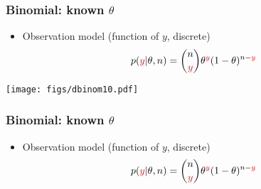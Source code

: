 \documentclass[10pt]{beamer}
\begin{document}
\begin{frame}
  \frametitle{Binomial: known $\theta$}

  \begin{itemize}
  \item {\color{blue}Observation model} (function of {\color{red} $y$}, discrete)
    \begin{align*}
      p({\color{red}y}|\theta,n) = \binom{n}{{\color{red}y}} \theta^{\color{red}y}(1-\theta)^{n-{\color{red}y}}
    \end{align*}
  \end{itemize}

  \begin{center}
    {\texttt{[image: figs/dbinom10.pdf]}\\
      \vspace{-0.6\baselineskip}
}
\end{center}
\end{frame}

\begin{frame}
  \frametitle{Binomial: known $\theta$}

  \begin{itemize}
  \item {\color{blue}Observation model} (function of {\color{red} $y$}, discrete)
    \begin{align*}
      p({\color{red}y}|\theta,n) = \binom{n}{{\color{red}y}} \theta^{\color{red}y}(1-\theta)^{n-{\color{red}y}}
    \end{align*}
  \end{itemize}

  \begin{center}
\end{center}
\end{frame}
\end{document}
